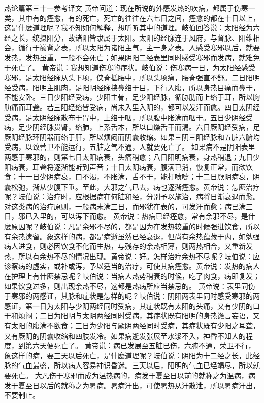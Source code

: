 \documentclass[a4paper,12pt,UTF8,twoside]{ctexbook}
\begin{document}
热论篇第三十一参考译文
黄帝问道：现在所说的外感发热的疾病，都属于伤寒一类，其中有的痊愈，有的死亡，死亡的往往在六七日之间，痊愈的都在十日以上，这是什麽道理呢？我不知如何解释，想听听其中的道理。岐伯回答说：太阳经为六经之长，统摄阳分，故诸阳皆隶属于太阳。太阳的经脉连于风府，与督脉、阳维相会，循行于巅背之表，所以太阳为诸阳主气，主一身之表。人感受寒邪以后，就要发热，发热虽重，一般不会死亡；如果阴阳二经表里同时感受寒邪而发病，就难免于死亡了。
黄帝说：我想知道伤寒的症状。岐伯说：伤寒病一日，为太阳经感受寒邪，足太阳经脉从头下项，侠脊抵腰中，所以头项痛，腰脊强直不舒。二日阳明经受病，阳明主肌肉，足阳明经脉挟鼻络于目，下行入腹，所以身热目痛而鼻干，不能安卧。三日少阳经受病，少阳主骨，足少阳经脉，循胁肋而上络于耳，所以胸肋痛而耳聋。若三阳经络皆受病，尚未入里入阴的，都可以发汗而愈。四日太阴经受病，足太阴经脉散布于胃中，上络于咽，所以腹中胀满而咽干。五日少阴经受病，足少阴经脉贯肾，络肺，上系舌本，所以口燥舌干而渴。六日厥阴经受病，足厥阴经脉环阴器而络于肝，所以烦闷而阴囊收缩。如果三阴三阳经脉和五脏六腑均受病，以致营卫不能运行，五脏之气不通，人就要死亡了。
如果病不是阴阳表里两感于寒邪的，则第七日太阳病衰，头痛稍愈；八日阳明病衰，身热稍退；九日少阳病衰，耳聋将逐渐能听到声音；十日太阴病衰，腹满已消，恢复正常，而欲饮食；十一日少阴病衰，口不渴，不胀满，舌不干，能打喷嚏；十二日厥阴病衰，阴囊松弛，渐从少腹下垂。至此，大邪之气已去，病也逐渐痊愈。黄帝说：怎麽治疗呢？岐伯说：治疗时，应根据病在何脏和经，分别予以施治，病将日渐衰退而愈。对这类病的治疗原则，一般病未满三日，而邪犹在表的，可发汗而愈；病已满三日，邪已入里的，可以泻下而愈。
黄帝说：热病已经痊愈，常有余邪不尽，是什麽原因呢？岐伯说：凡是余邪不尽的，都是因为在发热较重的时候强进饮食，所以有余热遗留。象这样的病，都是病逝虽然已经衰退，但尚有余热蕴藏于内，如勉强病人进食，则必因饮食不化而生热，与残存的余热相薄，则两热相合，又重新发热，所以有余热不尽的情况出现。黄帝说：好。怎样治疗余热不尽呢？岐伯说：应诊察病的虚实，或补或泻，予以适当的治疗，可使其病痊愈。黄帝说：发热的病人在护理上有什麽禁忌呢？岐伯说：当病人热势稍衰的时候，吃了肉食，病即复发；如果饮食过多，则出现余热不尽，这都是热病所应当禁忌的。
黄帝说：表里同伤于寒邪的两感证，其脉和症状是怎样的呢？岐伯说：阴阳两表里同时感受寒邪的两感证，第一日为太阳与少阴两经同时受病，其症状既有太阳的头痛，又有少阴的口干和烦闷；二日为阳明与太阴两经同时受病，其症状既有阳明的身热谵言妄语，又有太阳的腹满不欲食；三日为少阳与厥阴两经同时受病，其症状既有少阳之耳聋，又有厥阴的阴囊收缩和四肢发冷。如果病逝发张展至水浆不入，神昏不知人的程度，到第六天便死亡了。
黄帝说：病已发展至五脏已伤，六腑不通，荣卫不行，象这样的病，要三天以后死亡，是什麽道理呢？岐伯说：阴阳为十二经之长，此经脉的气血最盛，所以病人容易神识昏迷。三天以后，阳明的气血已经竭尽，所以就要死亡。
大凡伤于寒邪而成为温热病的，病发于夏至日以前的就称之为温病，病发于夏至日以后的就称之为暑病。暑病汗出，可使暑热从汗散泄，所以暑病汗出，不要制止。
\end{document}
